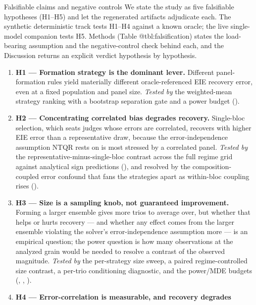 \documentclass[
  ignorenonframetext,
]{beamer}
\providecommand{\tightlist}{%
  \setlength{\itemsep}{0pt}\setlength{\parskip}{0pt}}
\begin{document}
\begin{frame}{Falsifiable claims and negative
controls}
\protect{}\label{falsifiable-claims-and-negative-controls}
We state the study as five falsifiable hypotheses (H1--H5) and let the
regenerated artifacts adjudicate each. The synthetic deterministic track
tests H1--H4 against a known oracle; the live single-model companion
tests H5. Methods (Table @tbl:falsification) states the load-bearing
assumption and the negative-control check behind each, and the
Discussion returns an explicit verdict hypothesis by hypothesis.

\begin{enumerate}
\tightlist
\item
  \textbf{H1 --- Formation strategy is the dominant lever.} Different
  panel-formation rules yield materially different oracle-referenced EIE
  recovery error, even at a fixed population and panel size.
  \emph{Tested by} the weighted-mean strategy ranking with a bootstrap
  separation gate and a power budget ().
\item
  \textbf{H2 --- Concentrating correlated bias degrades recovery.}
  Single-bloc selection, which seats judges whose errors are correlated,
  recovers with higher EIE error than a representative draw, because the
  error-independence assumption NTQR rests on is most stressed by a
  correlated panel. \emph{Tested by} the
  representative-minus-single-bloc contrast across the full regime grid
  against analytical sign predictions (), and resolved
  by the composition-coupled error confound that fans the strategies
  apart as within-bloc coupling rises ().
\item
  \textbf{H3 --- Size is a sampling knob, not guaranteed improvement.}
  Forming a larger ensemble gives more trios to average over, but
  whether that helps or hurts recovery --- and whether any effect comes
  from the larger ensemble violating the solver's error-independence
  assumption more --- is an empirical question; the power question is
  how many observations at the analyzed grain would be needed to resolve
  a contrast of the observed magnitude. \emph{Tested by} the
  per-strategy size sweep, a paired regime-controlled size contrast, a
  per-trio conditioning diagnostic, and the power/MDE budgets
  (, , ).
\item
  \textbf{H4 --- Error-correlation is measurable, and recovery degrades
}
\end{enumerate}
\end{frame}
\end{document}
